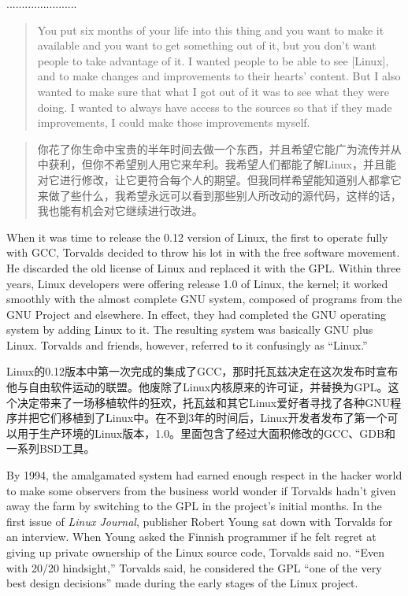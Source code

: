 \ifdefined\chs
.......................
\fi

\ifdefined\eng
\begin{quote}
You put six months of your life into this thing and you want to make it available and you want to get something out of it, but you don't want people to take advantage of it. I wanted people to be able to see [Linux], and to make changes and improvements to their hearts' content. But I also wanted to make sure that what I got out of it was to see what they were doing. I wanted to always have access to the sources so that if they made improvements, I could make those improvements myself.
\end{quote}
\fi

\ifdefined\chs
\begin{quote}
你花了你生命中宝贵的半年时间去做一个东西，并且希望它能广为流传并从中获利，但你不希望别人用它来牟利。我希望人们都能了解Linux，并且能对它进行修改，让它更符合每个人的期望。但我同样希望能知道别人都拿它来做了些什么，我希望永远可以看到那些别人所改动的源代码，这样的话，我也能有机会对它继续进行改进。
\end{quote}
\fi

\ifdefined\eng
When it was time to release the 0.12 version of Linux, the first to operate fully with GCC, Torvalds decided to throw his lot in with the free software movement. He discarded the old license of Linux and replaced it with the GPL. Within three years, Linux developers were offering release 1.0 of Linux, the kernel; it worked smoothly with the almost complete GNU system, composed of programs from the GNU Project and elsewhere.  In effect, they had completed the GNU operating system by adding Linux to it.  The resulting system was basically GNU plus Linux.  Torvalds and friends, however, referred to it confusingly as ``Linux.''
\fi

\ifdefined\chs
Linux的0.12版本中第一次完成的集成了GCC，那时托瓦兹决定在这次发布时宣布他与自由软件运动的联盟。他废除了Linux内核原来的许可证，并替换为GPL。这个决定带来了一场移植软件的狂欢，托瓦兹和其它Linux爱好者寻找了各种GNU程序并把它们移植到了Linux中。在不到3年的时间后，Linux开发者发布了第一个可以用于生产环境的Linux版本，1.0。里面包含了经过大面积修改的GCC、GDB和一系列BSD工具。
\fi

\ifdefined\eng
By 1994, the amalgamated system had earned enough respect in the hacker world to make some observers from the business world wonder if Torvalds hadn't given away the farm by switching to the GPL in the project's initial months. In the first issue of \textit{Linux Journal}, publisher Robert Young sat down with Torvalds for an interview. When Young asked the Finnish programmer if he felt regret at giving up private ownership of the Linux source code, Torvalds said no. ``Even with 20/20 hindsight,'' Torvalds said, he considered the GPL ``one of the very best design decisions'' made during the early stages of the Linux project.
\fi

